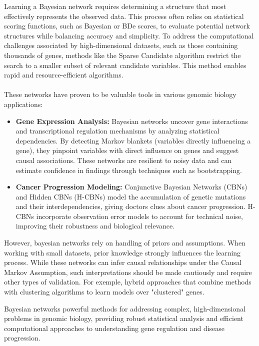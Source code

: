 Learning a Bayesian network requires determining a structure that most effectively represents the observed data.
This process often relies on statistical scoring functions, such as Bayesian or BDe scores, to evaluate potential network structures while balancing accuracy and simplicity.
To address the computational challenges associated by high-dimensional datasets, such as those containing thousands of genes, methods like the Sparse Candidate algorithm restrict the search to a smaller subset of relevant candidate variables.
This method enables rapid and resource-efficient algorithms\supercite{friedman_using_2000}.
\\\\
These networks have proven to be valuable tools in various genomic biology applications:
\begin{itemize}
    \item \textbf{Gene Expression Analysis:} Bayesian networks uncover gene interactions and transcriptional regulation mechanisms by analyzing statistical dependencies.
        By detecting Markov blankets (variables directly influencing a gene), they pinpoint variables with direct influence on genes and suggest causal associations.
        These networks are resilient to noisy data and can estimate confidence in findings through techniques such as bootstrapping.
    \item \textbf{Cancer Progression Modeling:} Conjunctive Bayesian Networks (CBNs) and Hidden CBNs (H-CBNs) model the accumulation of genetic mutations and their interdependencies, giving doctors clues about cancer progression.
        H-CBNs incorporate observation error models to account for technical noise, improving their robustness and biological relevance.
\end{itemize}

\noindent However, bayesian networks rely on handling of priors and assumptions.
When working with small datasets, prior knowledge strongly influences the learning process.
While these networks can infer causal relationships under the Causal Markov Assumption, such interpretations should be made cautiously and require other types of validation.
For exemple, hybrid approaches that combine methods with clustering algorithms to learn models over "clustered" genes\supercite{friedman_using_2000}.

\noindent Bayesian networks powerful methods for addressing complex, high-dimensional problems in genomic biology, providing robust statistical analysis and efficient computational approaches to understanding gene regulation and disease progression.


